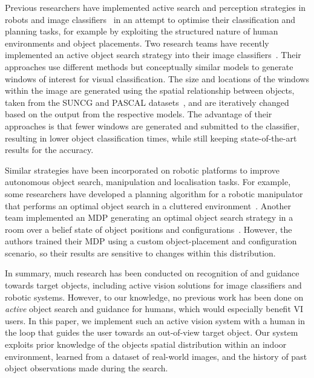 \documentclass[a4paper, twoside]{article}
\begin{document}
Previous researchers have implemented active search and perception strategies in robots and image classifiers~\cite{Bajcsy2017} in an attempt to optimise their classification and planning tasks, for example by exploiting the structured nature of human environments and object placements. 
%
Two research teams have recently implemented an active object search strategy into their image classifiers~\cite{caicedo2015active,gonzalez2015active}. Their approaches use different methods but conceptually similar models to generate windows of interest for visual classification. The size and locations of the windows within the image are generated using the spatial relationship between objects, taken from the SUNCG and PASCAL datasets~\cite{song2016ssc,Everingham10}, and are iteratively changed based on the output from the respective models. The advantage of their approaches is that fewer windows are generated and submitted to the classifier, resulting in lower object classification times, while still keeping state-of-the-art results for the accuracy. 

Similar strategies have been incorporated on robotic platforms to improve autonomous object search, manipulation and localisation tasks. For example, some researchers have developed a planning algorithm for a robotic manipulator that performs an optimal object search in a cluttered environment~\cite{dogar2014object}. Another team implemented an MDP generating an optimal object search strategy in a room over a belief state of object positions and configurations~\cite{aydemir2011search}. However, the authors trained their MDP using a custom object-placement and configuration scenario, so their results are sensitive to changes within this distribution. 

In summary, much research has been conducted on recognition of and guidance towards target objects, including active vision solutions for image classifiers and robotic systems. However, to our knowledge, no previous work has been done on {\em active} object search and guidance for humans, which would especially benefit VI users. In this paper, we implement such an active vision system with a human in the loop
that guides the user towards an out-of-view target object. Our system exploits prior knowledge of the objects spatial distribution within an indoor environment, learned from a dataset of real-world images, and the history of past object observations made during the search.
\end{document}
